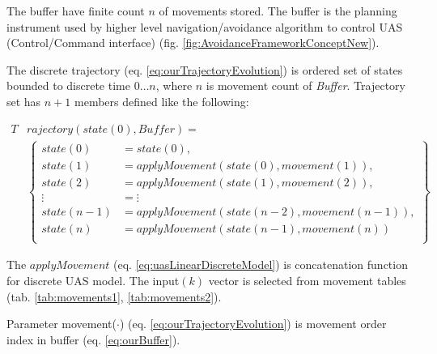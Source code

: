 \begin{note}
  The buffer have finite count $n$ of movements stored. The buffer is the planning instrument used by higher level navigation/avoidance algorithm to control UAS (Control/Command interface) (fig. \ref{fig:AvoidanceFrameworkConceptNew}).
\end{note}


The discrete trajectory (eq. \ref{eq:ourTrajectoryEvolution}) is ordered set of states bounded to discrete time $0\dots n$, where $n$ is movement count of \emph{Buffer}. Trajectory set has $n+1$ members defined like the following:

\begin{equation}\label{eq:ourTrajectoryEvolution}
    \begin{aligned}
    T&rajectory(state(0),Buffer)=\\
        &\left\{
        \begin{aligned}
            state(0) &= state(0),\\
            state(1) &= apply Movement\left(state(0), movement(1)\right),  \\
            state(2) &= apply Movement\left(state(1), movement(2)\right),  \\
             \vdots  &= \vdots\\
            state(n-1) &= apply Movement\left(state(n-2), movement(n-1)\right),  \\
            state(n)   &= apply Movement\left(state(n-1), movement(n)\right)  \\
        \end{aligned}
        \right\}
    \end{aligned}
\end{equation}

\noindent The $apply Movement$ (eq. \ref{eq:uasLinearDiscreteModel}) is concatenation function for discrete UAS model. The input$(k)$ vector is selected from movement tables (tab. \ref{tab:movements1}, \ref{tab:movements2}).

\begin{note}
	Parameter movement($\cdot$) (eq. \ref{eq:ourTrajectoryEvolution}) is movement order index in buffer (eq. \ref{eq:ourBuffer}).
\end{note}